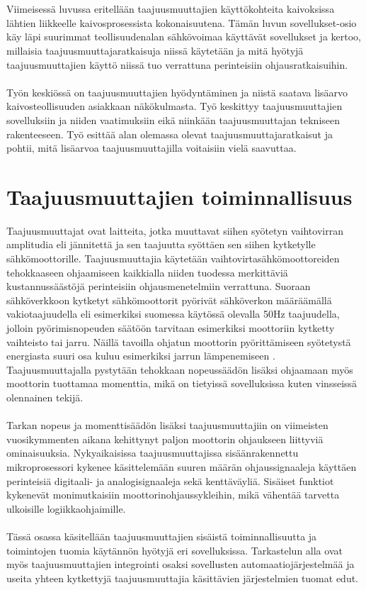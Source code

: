 \documentclass[finnish,12pt,a4paper,pdftex,elec,utf8]{aaltothesis}
\begin{document}
\\\\
Viimeisessä luvussa eritellään taajuusmuuttajien käyttökohteita kaivoksissa lähtien liikkeelle kaivosprosessista kokonaisuutena. Tämän luvun sovellukset-osio käy läpi suurimmat teollisuudenalan sähkövoimaa käyttävät sovellukset ja kertoo, millaisia taajuusmuuttajaratkaisuja niissä käytetään ja mitä hyötyjä taajuusmuuttajien käyttö niissä tuo verrattuna perinteisiin ohjausratkaisuihin.
\\\\
Työn keskiössä on taajuusmuuttajien hyödyntäminen ja niistä saatava lisäarvo kaivosteollisuuden asiakkaan näkökulmasta. Työ keskittyy taajuusmuuttajien sovelluksiin ja niiden vaatimuksiin eikä niinkään taajuusmuuttajan tekniseen rakenteeseen. Työ esittää alan olemassa olevat taajuusmuuttajaratkaisut ja pohtii, mitä lisäarvoa taajuusmuuttajilla voitaisiin vielä saavuttaa.
\clearpage

\section{Taajuusmuuttajien toiminnallisuus}
Taajuusmuuttajat ovat laitteita, jotka muuttavat siihen syötetyn vaihtovirran amplitudia eli jännitettä ja sen taajuutta syöttäen sen siihen kytketylle sähkömoottorille. Taajuusmuuttajia käytetään vaihtovirtasähkömoottoreiden tehokkaaseen ohjaamiseen kaikkialla niiden tuodessa merkittäviä kustannussäästöjä perinteisiin ohjausmenetelmiin verrattuna. Suoraan sähköverkkoon kytketyt sähkömoottorit pyörivät sähköverkon määräämällä vakiotaajuudella eli esimerkiksi suomessa käytössä olevalla 50Hz taajuudella, jolloin pyörimisnopeuden säätöön tarvitaan esimerkiksi moottoriin kytketty vaihteisto tai jarru. Näillä tavoilla ohjatun moottorin pyörittämiseen syötetystä energiasta suuri osa kuluu esimerkiksi jarrun lämpenemiseen \cite{ABBinmining}. Taajuusmuuttajalla pystytään tehokkaan nopeussäädön lisäksi ohjaamaan myös moottorin tuottamaa momenttia, mikä on tietyissä sovelluksissa kuten vinsseissä olennainen tekijä.
\\\\
Tarkan nopeus ja momenttisäädön lisäksi taajuusmuuttajiin on viimeisten vuosikymmenten aikana kehittynyt paljon moottorin ohjaukseen liittyviä ominaisuuksia. Nykyaikaisissa taajuusmuuttajissa sisäänrakennettu mikroprosessori kykenee käsittelemään suuren määrän ohjaussignaaleja käyttäen perinteisiä digitaali- ja analogisignaaleja sekä kenttäväyliä. Sisäiset funktiot kykenevät monimutkaisiin moottorinohjaussykleihin, mikä vähentää tarvetta ulkoisille logiikkaohjaimille. \cite{ABBtechnicalguide}
\\\\
Tässä osassa käsitellään taajuusmuuttajien sisäistä toiminnallisuutta ja toimintojen tuomia käytännön hyötyjä eri sovelluksissa. Tarkastelun alla ovat myös taajuusmuuttajien integrointi osaksi sovellusten automaatiojärjestelmää ja useita yhteen kytkettyjä taajuusmuuttajia käsittävien järjestelmien tuomat edut.
\end{document}
